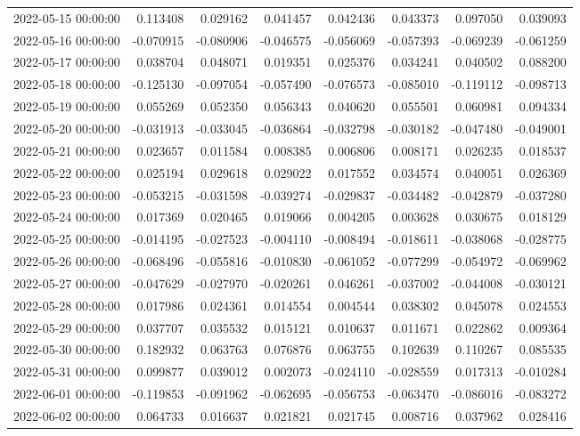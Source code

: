\begin{tabular}{lrrrrrrr}
2022-05-15 00:00:00 & 0.113408 & 0.029162 & 0.041457 & 0.042436 & 0.043373 & 0.097050 & 0.039093 \\
2022-05-16 00:00:00 & -0.070915 & -0.080906 & -0.046575 & -0.056069 & -0.057393 & -0.069239 & -0.061259 \\
2022-05-17 00:00:00 & 0.038704 & 0.048071 & 0.019351 & 0.025376 & 0.034241 & 0.040502 & 0.088200 \\
2022-05-18 00:00:00 & -0.125130 & -0.097054 & -0.057490 & -0.076573 & -0.085010 & -0.119112 & -0.098713 \\
2022-05-19 00:00:00 & 0.055269 & 0.052350 & 0.056343 & 0.040620 & 0.055501 & 0.060981 & 0.094334 \\
2022-05-20 00:00:00 & -0.031913 & -0.033045 & -0.036864 & -0.032798 & -0.030182 & -0.047480 & -0.049001 \\
2022-05-21 00:00:00 & 0.023657 & 0.011584 & 0.008385 & 0.006806 & 0.008171 & 0.026235 & 0.018537 \\
2022-05-22 00:00:00 & 0.025194 & 0.029618 & 0.029022 & 0.017552 & 0.034574 & 0.040051 & 0.026369 \\
2022-05-23 00:00:00 & -0.053215 & -0.031598 & -0.039274 & -0.029837 & -0.034482 & -0.042879 & -0.037280 \\
2022-05-24 00:00:00 & 0.017369 & 0.020465 & 0.019066 & 0.004205 & 0.003628 & 0.030675 & 0.018129 \\
2022-05-25 00:00:00 & -0.014195 & -0.027523 & -0.004110 & -0.008494 & -0.018611 & -0.038068 & -0.028775 \\
2022-05-26 00:00:00 & -0.068496 & -0.055816 & -0.010830 & -0.061052 & -0.077299 & -0.054972 & -0.069962 \\
2022-05-27 00:00:00 & -0.047629 & -0.027970 & -0.020261 & 0.046261 & -0.037002 & -0.044008 & -0.030121 \\
2022-05-28 00:00:00 & 0.017986 & 0.024361 & 0.014554 & 0.004544 & 0.038302 & 0.045078 & 0.024553 \\
2022-05-29 00:00:00 & 0.037707 & 0.035532 & 0.015121 & 0.010637 & 0.011671 & 0.022862 & 0.009364 \\
2022-05-30 00:00:00 & 0.182932 & 0.063763 & 0.076876 & 0.063755 & 0.102639 & 0.110267 & 0.085535 \\
2022-05-31 00:00:00 & 0.099877 & 0.039012 & 0.002073 & -0.024110 & -0.028559 & 0.017313 & -0.010284 \\
2022-06-01 00:00:00 & -0.119853 & -0.091962 & -0.062695 & -0.056753 & -0.063470 & -0.086016 & -0.083272 \\
2022-06-02 00:00:00 & 0.064733 & 0.016637 & 0.021821 & 0.021745 & 0.008716 & 0.037962 & 0.028416 \\

\end{tabular}
